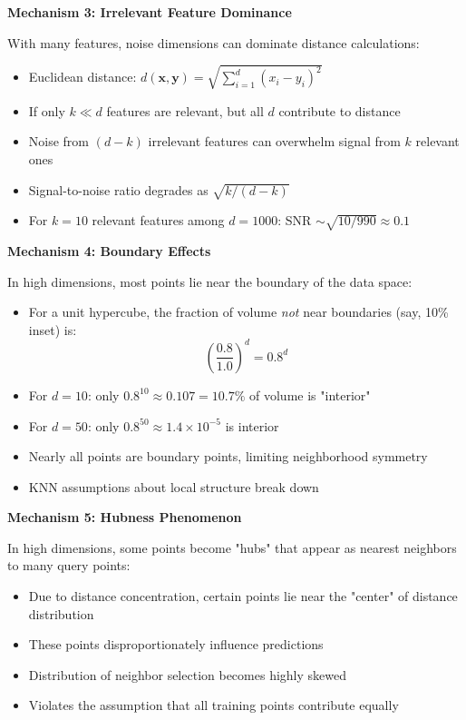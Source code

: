 \documentclass[12pt]{article}
\begin{document}
\begin{solution}
\textbf{Mechanism 3: Irrelevant Feature Dominance}

With many features, noise dimensions can dominate distance calculations:
\begin{itemize}
    \item Euclidean distance: \(d(\mathbf{x}, \mathbf{y}) = \sqrt{\sum_{i=1}^d (x_i - y_i)^2}\)
    \item If only \(k \ll d\) features are relevant, but all \(d\) contribute to distance
    \item Noise from \((d-k)\) irrelevant features can overwhelm signal from \(k\) relevant ones
    \item Signal-to-noise ratio degrades as \(\sqrt{k/(d-k)}\)
    \item For \(k=10\) relevant features among \(d=1000\): SNR \(\sim \sqrt{10/990} \approx 0.1\)
\end{itemize}

\textbf{Mechanism 4: Boundary Effects}

In high dimensions, most points lie near the boundary of the data space:
\begin{itemize}
    \item For a unit hypercube, the fraction of volume \textit{not} near boundaries (say, 10\% inset) is:
    \[
    \left(\frac{0.8}{1.0}\right)^d = 0.8^d
    \]
    \item For \(d=10\): only \(0.8^{10} \approx 0.107 = 10.7\%\) of volume is "interior"
    \item For \(d=50\): only \(0.8^{50} \approx 1.4 \times 10^{-5}\) is interior
    \item Nearly all points are boundary points, limiting neighborhood symmetry
    \item KNN assumptions about local structure break down
\end{itemize}

\textbf{Mechanism 5: Hubness Phenomenon}

In high dimensions, some points become "hubs" that appear as nearest neighbors to many query points:
\begin{itemize}
    \item Due to distance concentration, certain points lie near the "center" of distance distribution
    \item These points disproportionately influence predictions
    \item Distribution of neighbor selection becomes highly skewed
    \item Violates the assumption that all training points contribute equally
\end{itemize}


\end{solution}
\end{document}
